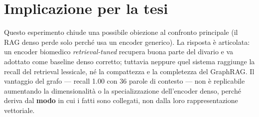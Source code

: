 \documentclass[11pt,a4paper]{report}
\begin{document}
\section{Implicazione per la tesi}

Questo esperimento chiude una possibile obiezione al confronto principale
(\guillemotleft{}il RAG denso perde solo perché usa un encoder generico\guillemotright{}). La risposta è
articolata: un encoder biomedico \emph{retrieval-tuned} recupera buona parte
del divario e va adottato come baseline denso corretto; tuttavia neppure quel
sistema raggiunge la recall del retrieval lessicale, né la compattezza e la
completezza del GraphRAG. Il vantaggio del grafo --- recall \num{1,00} con
\num{36} parole di contesto --- non è replicabile aumentando la dimensionalità
o la specializzazione dell'encoder denso, perché deriva dal \textbf{modo} in
cui i fatti sono collegati, non dalla loro rappresentazione vettoriale.
\end{document}
